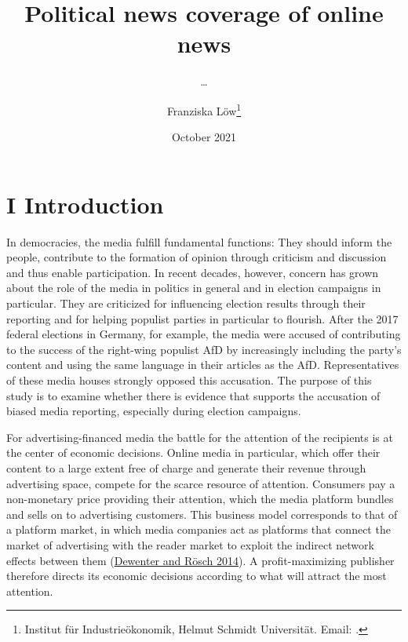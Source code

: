 \documentclass[
]{article}
\title{Political news coverage of online news}
\subtitle{\ldots{}}
\author{Franziska Löw\footnote{Institut für Industrieökonomik, Helmut
  Schmidt Universität. Email: .}}
\date{October 2021}
\begin{document}
\maketitle

\hypertarget{i-introduction}{%
\section{I Introduction}\label{i-introduction}}

In democracies, the media fulfill fundamental functions: They should
inform the people, contribute to the formation of opinion through
criticism and discussion and thus enable participation. In recent
decades, however, concern has grown about the role of the media in
politics in general and in election campaigns in particular. They are
criticized for influencing election results through their reporting and
for helping populist parties in particular to flourish. After the 2017
federal elections in Germany, for example, the media were accused of
contributing to the success of the right-wing populist AfD by
increasingly including the party's content and using the same language
in their articles as the AfD. Representatives of these media houses
strongly opposed this accusation. The purpose of this study is to
examine whether there is evidence that supports the accusation of biased
media reporting, especially during election campaigns.

For advertising-financed media the battle for the attention of the
recipients is at the center of economic decisions. Online media in
particular, which offer their content to a large extent free of charge
and generate their revenue through advertising space, compete for the
scarce resource of attention. Consumers pay a non-monetary price
providing their attention, which the media platform bundles and sells on
to advertising customers. This business model corresponds to that of a
platform market, in which media companies act as platforms that connect
the market of advertising with the reader market to exploit the indirect
network effects between them
(\protect\hyperlink{ref-dewenter_einfuhrung_2014}{Dewenter and Rösch
2014}). A profit-maximizing publisher therefore directs its economic
decisions according to what will attract the most attention.
\end{document}
